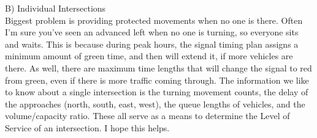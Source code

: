 \documentclass{report}
\begin{document}
\begin{appendices}
\noindent B) Individual Intersections \\
Biggest problem is providing protected movements when no one is there.
Often I'm sure you've seen an advanced left when no one is turning, so everyone sits and waits.
This is because during peak hours, the signal timing plan assigns a minimum amount of green time, and then will extend it, if more vehicles are there.
As well, there are maximum time lengths that will change the signal to red from green, even if there is more traffic coming through.
The information we like to know about a single intersection is the turning movement counts, the delay of the approaches (north, south, east, west), the queue lengths of vehicles, and the volume/capacity ratio.
These all serve as a means to determine the Level of Service of an intersection.
I hope this helps.
\end{appendices}
\end{document}
